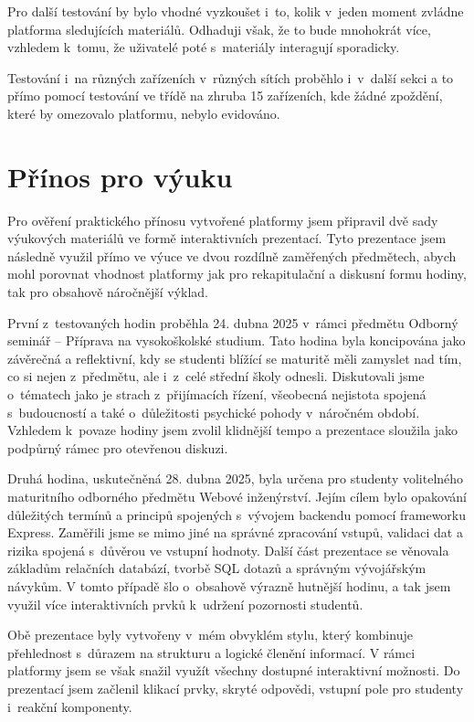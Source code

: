 Pro další testování by bylo vhodné vyzkoušet i~to, kolik v~jeden moment zvládne platforma sledujících materiálů.
Odhaduji však, že to bude mnohokrát více, vzhledem k~tomu, že uživatelé poté s~materiály interagují sporadicky.

Testování i~na různých zařízeních v~různých sítích proběhlo i~v~další sekci a to přímo pomocí testování ve třídě na zhruba 15 zařízeních, kde žádné zpoždění, které by omezovalo platformu, nebylo evidováno.

\section{Přínos pro výuku}

Pro ověření praktického přínosu vytvořené platformy jsem připravil dvě sady výukových materiálů ve formě interaktivních prezentací. 
Tyto prezentace jsem následně využil přímo ve výuce ve dvou rozdílně zaměřených předmětech, abych mohl porovnat vhodnost platformy jak pro rekapitulační a diskusní formu hodiny, tak pro obsahově náročnější výklad.

První z~testovaných hodin proběhla 24. dubna 2025 v~rámci předmětu Odborný seminář -- Příprava na vysokoškolské studium. 
Tato hodina byla koncipována jako závěrečná a reflektivní, kdy se studenti blížící se maturitě měli zamyslet nad tím, co si nejen z~předmětu, ale i~z~celé střední školy odnesli. 
Diskutovali jsme o~tématech jako je strach z~přijímacích řízení, všeobecná nejistota spojená s~budoucností a také o~důležitosti psychické pohody v~náročném období. 
Vzhledem k~povaze hodiny jsem zvolil klidnější tempo a prezentace sloužila jako podpůrný rámec pro otevřenou diskuzi.

Druhá hodina, uskutečněná 28. dubna 2025, byla určena pro studenty volitelného maturitního odborného předmětu Webové inženýrství. 
Jejím cílem bylo opakování důležitých termínů a principů spojených s~vývojem backendu pomocí frameworku Express. 
Zaměřili jsme se mimo jiné na správné zpracování vstupů, validaci dat a rizika spojená s~důvěrou ve vstupní hodnoty. 
Další část prezentace se věnovala základům relačních databází, tvorbě SQL dotazů a správným vývojářským návykům. 
V tomto případě šlo o~obsahově výrazně hutnější hodinu, a tak jsem využil více interaktivních prvků k~udržení pozornosti studentů.

Obě prezentace byly vytvořeny v~mém obvyklém stylu, který kombinuje přehlednost s~důrazem na strukturu a logické členění informací.
V rámci platformy jsem se však snažil využít všechny dostupné interaktivní možnosti.
Do prezentací jsem začlenil klikací prvky, skryté odpovědi, vstupní pole pro studenty i~reakční komponenty.

